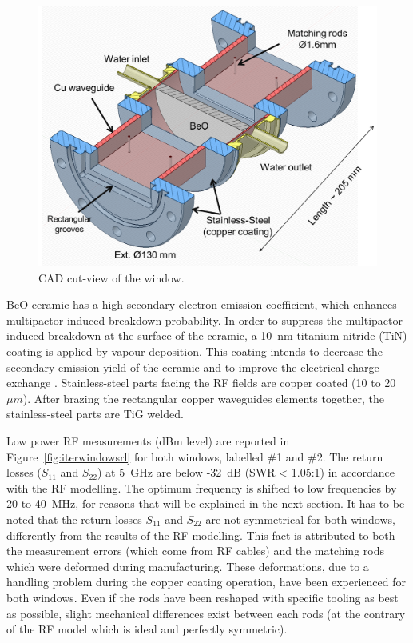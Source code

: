 \begin{figure}
	\centering
	\includegraphics[width=1.0\linewidth]{figures/chap3/ITER_window/ITER_windows_geometry}
	\caption{CAD cut-view of the window.}
	\label{fig:iterwindowsgeometry}
\end{figure}

BeO ceramic has a high secondary electron emission coefficient, which enhances multipactor induced breakdown probability. In order to suppress the multipactor induced breakdown at the surface of the ceramic, a 10~\si{nm} titanium nitride (TiN) coating is applied by vapour deposition. This coating intends to decrease the secondary emission yield of the ceramic and to improve the electrical charge exchange  . Stainless-steel parts facing the RF fields are copper coated (10 to 20~$\si{\mu m}$).  After brazing the rectangular copper waveguides elements together, the stainless-steel parts are TiG welded. 

Low power RF measurements (dBm level) are reported in Figure~\ref{fig:iterwindowsrl} for both windows, labelled \#1 and \#2. The return losses ($S_{11}$ and $S_{22}$) at 5~GHz are below -32~dB (SWR < 1.05:1) in accordance with the RF modelling. The optimum frequency is shifted to low frequencies by 20 to 40~MHz, for reasons that will be explained in the next section. It has to be noted that the return losses $S_{11}$ and $S_{22}$ are not symmetrical for both windows, differently from the results of the RF modelling. This fact is attributed to both the measurement errors (which come from RF cables) and the matching rods which were deformed during manufacturing. These deformations, due to a handling problem during the copper coating operation, have been experienced for both windows. Even if the rods have been reshaped with specific tooling as best as possible, slight mechanical differences exist between each rods (at the contrary of the RF model which is ideal and perfectly symmetric). 

